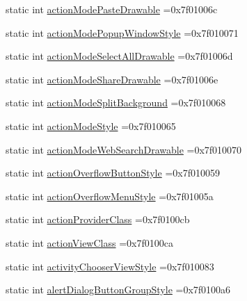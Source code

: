 \begin{DoxyCompactItemize}
static int \hyperlink{classandroid_1_1support_1_1v7_1_1appcompat_1_1R_1_1attr_a15a0bea2cfb65d234b8d8c3eb6befecf}{action\+Mode\+Paste\+Drawable} =0x7f01006c
\item 
static int \hyperlink{classandroid_1_1support_1_1v7_1_1appcompat_1_1R_1_1attr_a67a1d3ab65459d36fb09a31f7cc71c32}{action\+Mode\+Popup\+Window\+Style} =0x7f010071
\item 
static int \hyperlink{classandroid_1_1support_1_1v7_1_1appcompat_1_1R_1_1attr_a31728190ee213b9e5ffbbe837b33f781}{action\+Mode\+Select\+All\+Drawable} =0x7f01006d
\item 
static int \hyperlink{classandroid_1_1support_1_1v7_1_1appcompat_1_1R_1_1attr_a84010075b7707f56261c42ead124d7e4}{action\+Mode\+Share\+Drawable} =0x7f01006e
\item 
static int \hyperlink{classandroid_1_1support_1_1v7_1_1appcompat_1_1R_1_1attr_a599a8a1861414f1a5724072321e93195}{action\+Mode\+Split\+Background} =0x7f010068
\item 
static int \hyperlink{classandroid_1_1support_1_1v7_1_1appcompat_1_1R_1_1attr_aa62226bc0f0b851e6c4ba0e7ce6303e9}{action\+Mode\+Style} =0x7f010065
\item 
static int \hyperlink{classandroid_1_1support_1_1v7_1_1appcompat_1_1R_1_1attr_a4d77b136a61a153fead099d874a18831}{action\+Mode\+Web\+Search\+Drawable} =0x7f010070
\item 
static int \hyperlink{classandroid_1_1support_1_1v7_1_1appcompat_1_1R_1_1attr_a68be995b6a8f72f96ad87855fb5a8a7a}{action\+Overflow\+Button\+Style} =0x7f010059
\item 
static int \hyperlink{classandroid_1_1support_1_1v7_1_1appcompat_1_1R_1_1attr_a1283b228e85a0bcb0890079d6db3f115}{action\+Overflow\+Menu\+Style} =0x7f01005a
\item 
static int \hyperlink{classandroid_1_1support_1_1v7_1_1appcompat_1_1R_1_1attr_a1f37130cb6f2657163219c2ee7e10c99}{action\+Provider\+Class} =0x7f0100cb
\item 
static int \hyperlink{classandroid_1_1support_1_1v7_1_1appcompat_1_1R_1_1attr_a6d5e3aa635822a1187f7a25addca2321}{action\+View\+Class} =0x7f0100ca
\item 
static int \hyperlink{classandroid_1_1support_1_1v7_1_1appcompat_1_1R_1_1attr_ac1069fbab9c478efc0e749a230df462b}{activity\+Chooser\+View\+Style} =0x7f010083
\item 
static int \hyperlink{classandroid_1_1support_1_1v7_1_1appcompat_1_1R_1_1attr_aaa6f31eaee143e1e1907c80497272f38}{alert\+Dialog\+Button\+Group\+Style} =0x7f0100a6
\item 

\end{DoxyCompactItemize}
